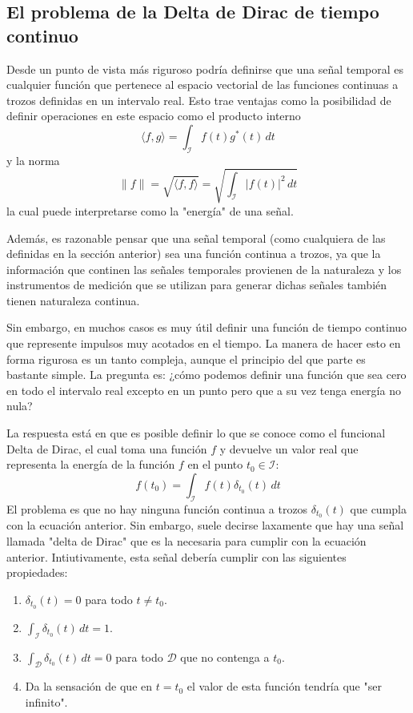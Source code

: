 \subsection{El problema de la Delta de Dirac de tiempo continuo}

Desde un punto de vista más riguroso podría definirse que una señal temporal es cualquier función que pertenece al espacio vectorial de las funciones continuas a trozos definidas en un intervalo real. Esto trae ventajas como la posibilidad de definir operaciones en este espacio como el producto interno
\begin{equation*}
    \langle f, g \rangle = \int_{\mathcal{I}} f(t) g^*(t) \, dt
\end{equation*}
y la norma
\begin{equation*}
    \|f\| = \sqrt{\langle f, f \rangle} = \sqrt{\int_{\mathcal{I}} |f(t)|^2 \, dt}
\end{equation*}
la cual puede interpretarse como la "energía" de una señal.

Además, es razonable pensar que una señal temporal (como cualquiera de las definidas en la sección anterior) sea una función continua a trozos, ya que la información que continen las señales temporales provienen de la naturaleza y los instrumentos de medición que se utilizan para generar dichas señales también tienen naturaleza continua. 

Sin embargo, en muchos casos es muy útil definir una función de tiempo continuo que represente impulsos muy acotados en el tiempo. La manera de hacer esto en forma rigurosa es un tanto compleja, aunque el principio del que parte es bastante simple. La pregunta es: ¿cómo podemos definir una función que sea cero en todo el intervalo real excepto en un punto pero que a su vez tenga energía no nula?

La respuesta está en que es posible definir lo que se conoce como el funcional Delta de Dirac, el cual toma una función $f$ y devuelve un valor real que representa la energía de la función $f$ en el punto $t_0 \in \mathcal{I}$:
\begin{equation*}
    f(t_0) = \int_{\mathcal{I}} f(t) \delta_{t_0}(t) \, dt
\end{equation*}
El problema es que no hay ninguna función continua a trozos $\delta_{t_0}(t)$ que cumpla con la ecuación anterior. Sin embargo, suele decirse laxamente que hay una señal llamada "delta de Dirac" que es la necesaria para cumplir con la ecuación anterior. Intiutivamente, esta señal debería cumplir con las siguientes propiedades:
\begin{enumerate}
    \item $\delta_{t_0}(t) = 0$ para todo $t \neq t_0$.
    \item $\int_{\mathcal{I}} \delta_{t_0}(t) \, dt = 1$.
    \item $\int_{\mathcal{D}} \delta_{t_0}(t) \, dt = 0$ para todo $\mathcal{D}$ que no contenga a $t_0$.
    \item Da la sensación de que en $t=t_0$ el valor de esta función tendría que "ser infinito". 
\end{enumerate}

